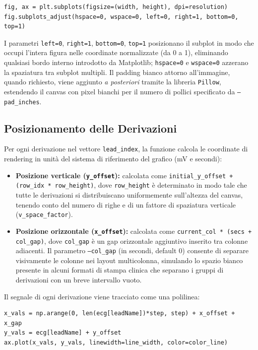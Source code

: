 \begin{verbatim}
fig, ax = plt.subplots(figsize=(width, height), dpi=resolution)
fig.subplots_adjust(hspace=0, wspace=0, left=0, right=1, bottom=0, top=1)
\end{verbatim}

I parametri \texttt{left=0}, \texttt{right=1}, \texttt{bottom=0}, \texttt{top=1} posizionano il subplot in modo che occupi l'intera figura nelle coordinate normalizzate (da 0 a 1), eliminando qualsiasi bordo interno introdotto da Matplotlib; \texttt{hspace=0} e \texttt{wspace=0} azzerano la spaziatura tra subplot multipli. Il padding bianco attorno all'immagine, quando richiesto, viene aggiunto \textit{a posteriori} tramite la libreria \texttt{Pillow}, estendendo il canvas con pixel bianchi per il numero di pollici specificato da \texttt{--pad\_inches}.

\subsection{Posizionamento delle Derivazioni}

Per ogni derivazione nel vettore \texttt{lead\_index}, la funzione calcola le coordinate di rendering in unità del sistema di riferimento del grafico (mV e secondi):

\begin{itemize}
    \item \textbf{Posizione verticale (\texttt{y\_offset}):} calcolata come \texttt{initial\_y\_offset + (row\_idx * row\_height)}, dove \texttt{row\_height} è determinato in modo tale che tutte le derivazioni si distribuiscano uniformemente sull'altezza del canvas, tenendo conto del numero di righe e di un fattore di spaziatura verticale (\texttt{v\_space\_factor}).
    \item \textbf{Posizione orizzontale (\texttt{x\_offset}):} calcolata come \texttt{current\_col * (secs + col\_gap)}, dove \texttt{col\_gap} è un gap orizzontale aggiuntivo inserito tra colonne adiacenti. Il parametro \texttt{--col\_gap} (in secondi, default 0) consente di separare visivamente le colonne nei layout multicolonna, simulando lo spazio bianco presente in alcuni formati di stampa clinica che separano i gruppi di derivazioni con un breve intervallo vuoto.
\end{itemize}

Il segnale di ogni derivazione viene tracciato come una polilinea:
\begin{verbatim}
x_vals = np.arange(0, len(ecg[leadName])*step, step) + x_offset + x_gap
y_vals = ecg[leadName] + y_offset
ax.plot(x_vals, y_vals, linewidth=line_width, color=color_line)
\end{verbatim}

